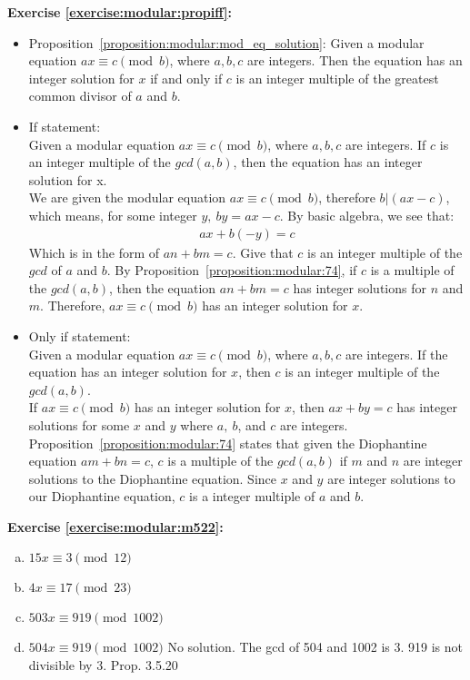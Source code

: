 \noindent\textbf{Exercise \ref{exercise:modular:propiff}:} %
\begin{itemize}
\item
Proposition~\ref{proposition:modular:mod_eq_solution}: Given a modular equation $ax\equiv c \pmod{b}$, where $a,b,c$ are integers. Then the equation has an integer solution for $x$ if and only if $c$ is an integer multiple of the greatest common divisor of $a$ and $b$.
        
\item 
If statement:\\
Given a modular equation $ax\equiv c \pmod{b}$, where $a,b,c$ are integers. If $c$ is an integer multiple of the $gcd(a,b)$, then the equation has an integer solution for x.\\
We are given the modular equation $ax\equiv c \pmod{b}$, therefore $b|(ax-c)$, which means, for some integer $y,\ by = ax - c$. By basic algebra, we see that:
\begin{align*}
ax + b(-y) = c 
\end{align*}
Which is in the form of $an + bm = c$. Give that $c$ is an integer multiple of the $gcd$ of $a$ and $b$. By Proposition~\ref{proposition:modular:74}, if $c$ is a multiple of the $gcd(a,b)$, then the equation $an + bm = c$ has integer solutions for $n$ and $m$. Therefore, $ax\equiv c \pmod{b}$ has an integer solution for $x$.
        
\item 
Only if statement:\\
Given a modular equation $ax\equiv c \pmod{b}$, where $a, b, c$ are integers. If the equation has an integer solution for $x$, then $c$ is an integer multiple of the $gcd(a,b)$.\\
        
If $ax\equiv c \pmod{b}$ has an integer solution for $x$, then $ax + by = c$ has integer solutions for some $x$ and $y$ where $a,\ b$, and $c$ are integers. Proposition~\ref{proposition:modular:74} states that given the Diophantine equation $am + bn = c$, $c$ is a multiple of the $gcd(a,b)$ if $m$ and $n$ are integer solutions to the Diophantine equation. Since $x$ and $y$ are integer solutions to our Diophantine equation, $c$ is a integer multiple of $a$ and $b$.
\end{itemize}


\noindent\textbf{Exercise \ref{exercise:modular:m522}:}%
\begin{enumerate}[(a)]
\item
$15x \equiv 3 \pmod{12}$
\item
$4x \equiv 17 \pmod{23}$
\item
$503x \equiv 919 \pmod{1002}$
\item
$504x \equiv 919 \pmod{1002}$
No solution. The gcd of 504 and 1002 is 3. 919 is not divisible by 3. Prop. 3.5.20
\end{enumerate}

